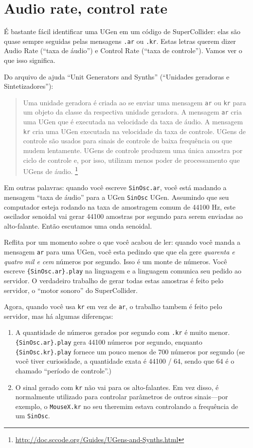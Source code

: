 \section{Audio rate, control rate}

É bastante fácil identificar uma UGen em um código de SuperCollider: elas são quase sempre seguidas pelas mensagens \texttt{.ar} ou \texttt{.kr}. Estas letras querem dizer Audio Rate (“taxa de áudio”) e Control Rate (“taxa de controle”). Vamos ver o que isso significa.

Do arquivo de ajuda “Unit Generators and Synths” (“Unidades geradoras e Sintetizadores”): 

\begin{quotation}
Uma unidade geradora é criada ao se enviar uma mensagem \texttt{ar} ou \texttt{kr} para um objeto da classe da respectiva unidade geradora. A mensagem \texttt{ar} cria uma UGen que é executada na velocidade da taxa de áudio. A mensagem \texttt{kr} cria uma UGen executada na velocidade da taxa de controle. UGens de controle são usados para sinais de controle de baixa frequência ou que mudem lentamente. UGens de controle produzem uma única amostra por ciclo de controle e, por isso, utilizam menos poder de processamento que UGens de áudio. \footnote{\url{http://doc.sccode.org/Guides/UGens-and-Synths.html}}
\end{quotation}

Em outras palavras: quando você escreve \texttt{SinOsc.ar}, você está madando a mensagem “taxa de áudio” para a UGen  \texttt{SinOsc} UGen. Assumindo que seu computador esteja rodando na taxa de amostragem comum de 44100 Hz, este oscilador senoidal vai gerar 44100 amostras por segundo para serem enviadas ao alto-falante. Então escutamos uma onda senoidal.

Reflita por um momento sobre o que você acabou de ler: quando você manda a mensagem \texttt{ar} para uma UGen, você esta pedindo que que ela gere \emph{quarenta e quatro mil e cem} números por segundo. Isso é um monte de números. Você escreve \texttt{\{SinOsc.ar\}.play} na linguagem e a linguagem comunica seu pedido ao servidor. O verdadeiro trabalho de gerar todas estas amostras é feito pelo servidor, o “motor sonoro” do SuperCollider.

Agora, quando você usa \texttt{kr} em vez de \texttt{ar}, o trabalho tambem é feito pelo servidor, mas há algumas diferenças:
\begin{enumerate}
\item A quantidade de números gerados por segundo com \texttt{.kr} é muito menor. \texttt{\{SinOsc.ar\}.play} gera 44100 números por segundo, enquanto \texttt{\{SinOsc.kr\}.play} fornece um pouco menos de 700 números por segundo (se você tiver curiosidade, a quantidade exata é 44100 / 64, sendo que 64 é o chamado “período de controle”.)
\item O sinal gerado com \texttt{kr} não vai para os alto-falantes. Em vez disso, é normalmente utilizado para controlar parâmetros de outros sinais—por exemplo, o \texttt{MouseX.kr} no seu theremim estava controlando a frequência de um \texttt{SinOsc}.

\end{enumerate} 

